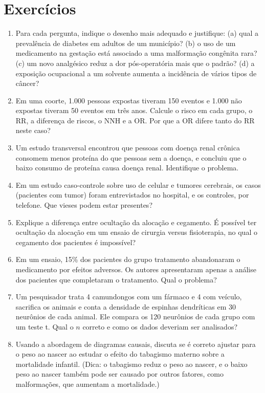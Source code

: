 \documentclass[
]{book}
\begin{document}
\section{Exercícios}\label{exercuxedcios-2}

\begin{enumerate}
\def\labelenumi{\arabic{enumi}.}
\item
  Para cada pergunta, indique o desenho mais adequado e justifique: (a) qual a prevalência de diabetes em adultos de um município? (b) o uso de um medicamento na gestação está associado a uma malformação congênita rara? (c) um novo analgésico reduz a dor pós-operatória mais que o padrão? (d) a exposição ocupacional a um solvente aumenta a incidência de vários tipos de câncer?
\item
  Em uma coorte, 1.000 pessoas expostas tiveram 150 eventos e 1.000 não expostas tiveram 50 eventos em três anos. Calcule o risco em cada grupo, o RR, a diferença de riscos, o NNH e a OR. Por que a OR difere tanto do RR neste caso?
\item
  Um estudo transversal encontrou que pessoas com doença renal crônica consomem menos proteína do que pessoas sem a doença, e concluiu que o baixo consumo de proteína causa doença renal. Identifique o problema.
\item
  Em um estudo caso-controle sobre uso de celular e tumores cerebrais, os casos (pacientes com tumor) foram entrevistados no hospital, e os controles, por telefone. Que vieses podem estar presentes?
\item
  Explique a diferença entre ocultação da alocação e cegamento. É possível ter ocultação da alocação em um ensaio de cirurgia versus fisioterapia, no qual o cegamento dos pacientes é impossível?
\item
  Em um ensaio, 15\% dos pacientes do grupo tratamento abandonaram o medicamento por efeitos adversos. Os autores apresentaram apenas a análise dos pacientes que completaram o tratamento. Qual o problema?
\item
  Um pesquisador trata 4 camundongos com um fármaco e 4 com veículo, sacrifica os animais e conta a densidade de espinhas dendríticas em 30 neurônios de cada animal. Ele compara os 120 neurônios de cada grupo com um teste t. Qual o \(n\) correto e como os dados deveriam ser analisados?
\item
  Usando a abordagem de diagramas causais, discuta se é correto ajustar para o peso ao nascer ao estudar o efeito do tabagismo materno sobre a mortalidade infantil. (Dica: o tabagismo reduz o peso ao nascer, e o baixo peso ao nascer também pode ser causado por outros fatores, como malformações, que aumentam a mortalidade.)
\end{enumerate}
\end{document}
